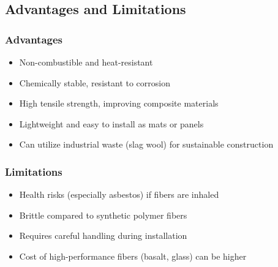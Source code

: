 \documentclass[12pt,a4paper]{article}
\begin{document}
\subsection{Advantages and Limitations}

\subsubsection{Advantages}
\begin{itemize}
    \item Non-combustible and heat-resistant
    \item Chemically stable, resistant to corrosion
    \item High tensile strength, improving composite materials
    \item Lightweight and easy to install as mats or panels
    \item Can utilize industrial waste (slag wool) for sustainable construction
\end{itemize}

\subsubsection{Limitations}
\begin{itemize}
    \item Health risks (especially asbestos) if fibers are inhaled
    \item Brittle compared to synthetic polymer fibers
    \item Requires careful handling during installation
    \item Cost of high-performance fibers (basalt, glass) can be higher
\end{itemize}
\end{document}
